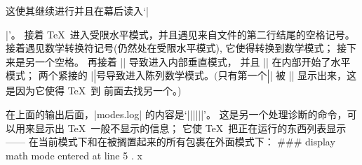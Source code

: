 这使其继续进行并且在幕后读入`|{|'。%
接着 \TeX\ 进入受限水平模式，并且遇见来自文件的第二行结尾的空格记号。%
接着遇见数学转换符记号(仍然处在受限水平模式), 它使得转换到数学模式；
接下来是另一个空格。%
再接着 |\vbox| 导致进入内部垂直模\hbox{式，} 并且 |\noindent| 在内部开始了水平模式；
两个紧接的 |$| 号导致进入陈列数学模式。
(只有第一个 |$| 被 |\tracingcommands| 显示出来，这是因为它使得 \TeX\ 到%
前面去找另一个。)

\danger 在上面的输出后面，|modes.log| 的内容是`|{||\showlists||}|'。%
这是另一个处理诊断的命令，可以用来显示出 \TeX\ 一般不显示的信息；
它使 \TeX\ 把正在运行的东西列表显示——%
在当前模式下和在被搁置起来的所有包裹在外面模式下：
\begintt
### display math mode entered at line 5
\mathord
. x
}
